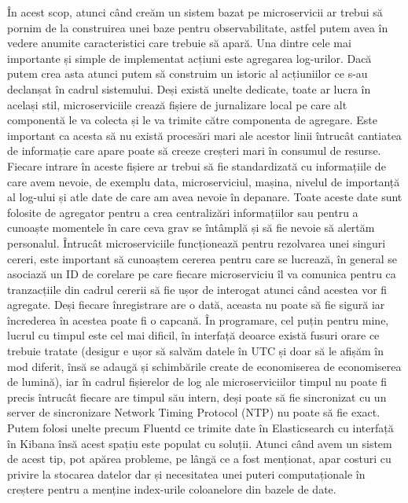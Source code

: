 În acest scop, atunci când creăm un sistem bazat pe microservicii ar trebui să pornim de 
la construirea unei baze pentru observabilitate, astfel putem avea în vedere anumite 
caracteristici care trebuie să apară. Una dintre cele mai importante și simple de implementat
acțiuni este agregarea log-urilor. Dacă putem crea asta atunci putem să construim un istoric
al acțiuniilor ce s-au declanșat în cadrul sistemului. Deși există unelte dedicate, toate
ar lucra în același stil, microserviciile crează fișiere de jurnalizare local pe care alt componentă
le va colecta și le va trimite către componenta de agregare. Este important ca acesta să nu există procesări mari 
ale acestor linii întrucât cantiatea de informație care apare poate să creeze creșteri mari în
consumul de resurse. Fiecare intrare în aceste fișiere ar trebui să fie standardizată cu informațiile 
de care avem nevoie, de exemplu data, microserviciul, mașina, nivelul de importanță al log-ului și 
atle date de care am avea nevoie în depanare. Toate aceste date sunt folosite de agregator pentru 
a crea centralizări informațiilor sau pentru a cunoaște momentele în care ceva grav se întâmplă
și să fie nevoie să alertăm personalul. Întrucât microserviciile funcționează pentru rezolvarea
unei singuri cereri, este important să cunoaștem cererea pentru care se lucrează,
în general se asociază un ID de corelare pe care fiecare microserviciu îl va comunica 
pentru ca tranzacțiile din cadrul cererii să fie ușor de interogat atunci când acestea vor fi
agregate. Deși fiecare înregistrare are o dată, aceasta nu poate să fie sigură iar încrederea în 
acestea poate fi o capcană. În programare, cel puțin pentru mine, lucrul cu timpul este cel mai dificil,
în interfață deoarce există fusuri orare ce trebuie tratate (desigur e ușor să salvăm datele 
în UTC și doar să le afișăm în mod diferit, însă se adaugă și schimbările create de economiserea
de economiserea de lumină), iar în cadrul fișierelor de log ale microserviciilor 
timpul nu poate fi precis întrucât fiecare are timpul său intern, deși poate să fie sincronizat
cu un server de sincronizare Network Timing Protocol (NTP) nu poate să fie exact. Putem folosi 
unelte precum Fluentd ce trimite date în Elasticsearch cu interfață în Kibana însă acest spațiu
este populat cu soluții. Atunci când avem un sistem de acest tip, pot apărea probleme, pe lângă ce a
fost menționat, apar costuri cu privire la stocarea datelor dar și necesitatea unei puteri computaționale
în creștere pentru a menține index-urile coloanelore din bazele de date.


